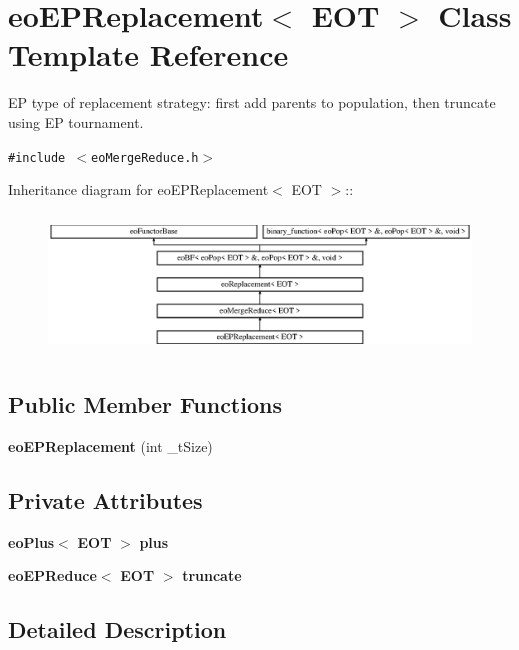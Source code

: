 \section{eo\-EPReplacement$<$ EOT $>$ Class Template Reference}
\label{classeo_e_p_replacement}
EP type of replacement strategy: first add parents to population, then truncate using EP tournament.  


{\tt \#include $<$eo\-Merge\-Reduce.h$>$}

Inheritance diagram for eo\-EPReplacement$<$ EOT $>$::\begin{figure}[H]
\begin{center}
\leavevmode
\includegraphics[height=3.76344cm]{classeo_e_p_replacement}
\end{center}
\end{figure}
\subsection*{Public Member Functions}
\begin{CompactItemize}
\item 
{\bf eo\-EPReplacement} (int \_\-t\-Size)\label{classeo_e_p_replacement_a0}

\end{CompactItemize}
\subsection*{Private Attributes}
\begin{CompactItemize}
\item 
{\bf eo\-Plus}$<$ {\bf EOT} $>$ {\bf plus}\label{classeo_e_p_replacement_r0}

\item 
{\bf eo\-EPReduce}$<$ {\bf EOT} $>$ {\bf truncate}\label{classeo_e_p_replacement_r1}

\end{CompactItemize}


\subsection{Detailed Description}
